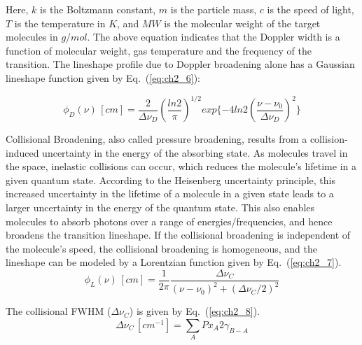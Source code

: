 \vspace{3mm}

\noindent Here, $k$ is the Boltzmann constant, $m$ is the particle mass, $c$ is the speed of light, $T$ is the temperature in $K$, and $MW$ is the molecular weight of the  target molecules in $g$/$mol$. The above equation indicates that the Doppler width is a function of molecular weight, gas temperature and the frequency of the transition. The lineshape profile due to Doppler broadening alone has a Gaussian lineshape function given by Eq.\ (\ref{eq:ch2_6}):

\begin{equation}\label{eq:ch2_6}
\phi_D(\nu) \,[cm]=\frac{2}{\Delta\nu_D}(\frac{ln2}{\pi})^{1/2}exp\{-4ln2(\frac{\nu-\nu_0}{\Delta\nu_D})^2\}
\end{equation}

\vspace{3mm}

Collisional Broadening, also called pressure broadening, results from a collision-induced uncertainty in the energy of the absorbing state. As molecules travel in the space, inelastic collisions can occur, which reduces the molecule's lifetime in a given quantum state. According to the Heisenberg uncertainty principle, this increased uncertainty in the lifetime of a molecule in a given state leads to a larger uncertainty in the energy of the quantum state. This also enables molecules to absorb photons over a range of energies/frequencies, and hence broadens the transition lineshape. If the collisional broadening is independent of the molecule's speed, the collisional broadening is homogeneous, and the lineshape can be modeled by a Lorentzian function given by Eq.\ (\ref{eq:ch2_7}). 
\begin{equation}\label{eq:ch2_7}
\phi_L(\nu) \,[cm]=\frac{1}{2\pi}\frac{\Delta\nu_C}{(\nu-\nu_0)^2+(\Delta\nu_C/2)^2}
\end{equation}

\vspace{3mm}

\noindent The collisional FWHM ($\Delta\nu_C$) is given by Eq.\ (\ref{eq:ch2_8}).
\begin{equation}\label{eq:ch2_8}
\Delta\nu_C \,[cm^{-1}]=\sum_A Px_A2\gamma_{B-A} 
\end{equation}

